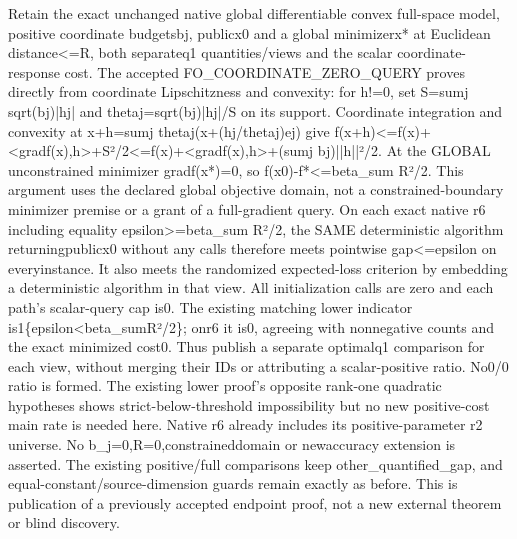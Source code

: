\documentclass[10pt,a4paper]{article}
\begin{document}
\begingroup\raggedright\sloppy Retain the exact unchanged native global differentiable convex full-space model,\allowbreak{} positive coordinate budgetsbj,\allowbreak{} publicx0 and a global minimizerx* at Euclidean distance<=\allowbreak{}R,\allowbreak{} both separateq1 quantities/\allowbreak{}views and the scalar coordinate-response cost. The accepted FO\_\allowbreak{}COORDINATE\_\allowbreak{}ZERO\_\allowbreak{}QUERY proves directly from coordinate Lipschitzness and convexity:\allowbreak{} for h!=\allowbreak{}0,\allowbreak{} set S=\allowbreak{}sumj sqrt(bj)|hj| and thetaj=\allowbreak{}sqrt(bj)|hj|/\allowbreak{}S on its support. Coordinate integration and convexity at x+h=\allowbreak{}sumj thetaj(x+(hj/\allowbreak{}thetaj)ej) give f(x+h)<=\allowbreak{}f(x)+<gradf(x),\allowbreak{}h>+S{\AtlasUnicodeText ²}\allowbreak{}/\allowbreak{}2<=\allowbreak{}f(x)+<gradf(x),\allowbreak{}h>+(sumj bj)||h||{\AtlasUnicodeText ²}\allowbreak{}/\allowbreak{}2. At the GLOBAL unconstrained minimizer gradf(x*)=\allowbreak{}0,\allowbreak{} so f(x0)-f*<=\allowbreak{}beta\_\allowbreak{}sum R{\AtlasUnicodeText ²}\allowbreak{}/\allowbreak{}2. This argument uses the declared global objective domain,\allowbreak{} not a constrained-boundary minimizer premise or a grant of a full-gradient query. On each exact native r6 including equality epsilon>=\allowbreak{}beta\_\allowbreak{}sum R{\AtlasUnicodeText ²}\allowbreak{}/\allowbreak{}2,\allowbreak{} the SAME deterministic algorithm returningpublicx0 without any calls therefore meets pointwise gap<=\allowbreak{}epsilon on everyinstance. It also meets the randomized expected-loss criterion by embedding a deterministic algorithm in that view. All initialization calls are zero and each path's scalar-query cap is0. The existing matching lower indicator is1\{epsilon<beta\_\allowbreak{}sumR{\AtlasUnicodeText ²}\allowbreak{}/\allowbreak{}2\};\allowbreak{} onr6 it is0,\allowbreak{} agreeing with nonnegative counts and the exact minimized cost0. Thus publish a separate optimalq1 comparison for each view,\allowbreak{} without merging their IDs or attributing a scalar-positive ratio. No0/\allowbreak{}0 ratio is formed. The existing lower proof's opposite rank-one quadratic hypotheses shows strict-below-threshold impossibility but no new positive-cost main rate is needed here. Native r6 already includes its positive-parameter r2 universe. No b\_\allowbreak{}j=\allowbreak{}0,\allowbreak{}R=\allowbreak{}0,\allowbreak{}constraineddomain or newaccuracy extension is asserted. The existing positive/\allowbreak{}full comparisons keep other\_\allowbreak{}quantified\_\allowbreak{}gap,\allowbreak{} and equal-constant/\allowbreak{}source-dimension guards remain exactly as before. This is publication of a previously accepted endpoint proof,\allowbreak{} not a new external theorem or blind discovery.\par\endgroup
\end{document}
